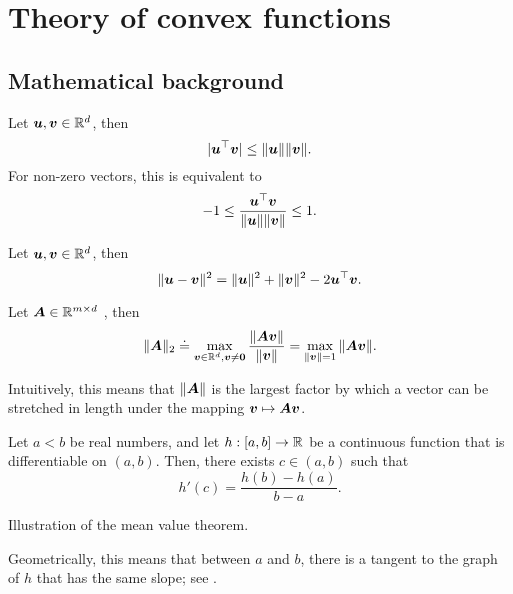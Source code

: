 \section{Theory of convex functions}

\subsection{Mathematical background}

\begin{theorem}
    Let $\bm{u},\bm{v}\in \mathbb{R}^d$, then \[
        |\bm{u}^\top \bm{v}| \leq \|\bm{u}\| \|\bm{v}\|.
    \]
    For non-zero vectors, this is equivalent to \[
        -1 \leq \frac{\bm{u}^\top \bm{v}}{\|\bm{u}\| \|\bm{v}\|} \leq 1.
    \]
\end{theorem}

\begin{theorem}
    Let $\bm{u}, \bm{v} \in \mathbb{R}^d$, then \[
        \| \bm{u} - \bm{v} \|^2 = \| \bm{u} \|^2 + \| \bm{v} \|^2 - 2 \bm{u}^\top\bm{v}.
    \]
\end{theorem}

\begin{definition}
    Let $\bm{A} \in \mathbb{R}^{m \times d}$ , then \[
        \|\bm{A}\|_2 \doteq \max_{\bm{v}\in \mathbb{R}^d, \bm{v}\neq \bm{0}} \frac{\|\bm{A}\bm{v}\|}{\|\bm{v}\|} = \max_{\|\bm{v}\| = 1} \|\bm{A}\bm{v}\|.
    \]
\end{definition}

Intuitively, this means that $\|\bm{A}\|$ is the largest factor by which a vector can be stretched
in length under the mapping $\bm{v}\mapsto\bm{A}\bm{v}$.

\begin{theorem}
    Let $a<b$ be real numbers, and let $h: [a,b]\to \mathbb{R}$ be a continuous function that is differentiable
    on $(a,b)$. Then, there exists $c\in(a,b)$ such that \[
        h'(c) = \frac{h(b) - h(a)}{b-a}.
    \]
\end{theorem}

\begin{marginfigure}
    \centering
    \caption{Illustration of the mean value theorem.}
    \label{fig:mean-value-theorem}
\end{marginfigure}

Geometrically, this means that between $a$ and $b$, there is a tangent to the graph of $h$ that has
the same slope; see .

